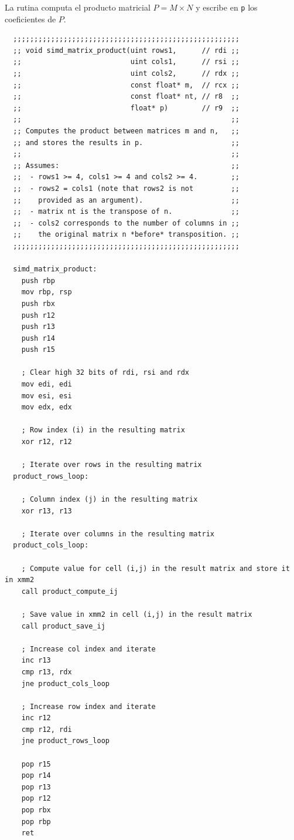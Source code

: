 \documentclass[a4paper, 10pt, twoside]{article}
\newcommand{\cc}[1]{\texttt{#1}}
\begin{document}
La rutina computa el producto matricial $P = M \times N$ y escribe en \cc{p}
los coeficientes de $P$.

\begin{verbatim}
  ;;;;;;;;;;;;;;;;;;;;;;;;;;;;;;;;;;;;;;;;;;;;;;;;;;;;;;
  ;; void simd_matrix_product(uint rows1,      // rdi ;;
  ;;                          uint cols1,      // rsi ;;
  ;;                          uint cols2,      // rdx ;;
  ;;                          const float* m,  // rcx ;;
  ;;                          const float* nt, // r8  ;;
  ;;                          float* p)        // r9  ;;
  ;;                                                  ;;
  ;; Computes the product between matrices m and n,   ;;
  ;; and stores the results in p.                     ;;
  ;;                                                  ;;
  ;; Assumes:                                         ;;
  ;;  - rows1 >= 4, cols1 >= 4 and cols2 >= 4.        ;;
  ;;  - rows2 = cols1 (note that rows2 is not         ;;
  ;;    provided as an argument).                     ;;
  ;;  - matrix nt is the transpose of n.              ;;
  ;;  - cols2 corresponds to the number of columns in ;;
  ;;    the original matrix n *before* transposition. ;;
  ;;;;;;;;;;;;;;;;;;;;;;;;;;;;;;;;;;;;;;;;;;;;;;;;;;;;;;

  simd_matrix_product:
    push rbp
    mov rbp, rsp
    push rbx
    push r12
    push r13
    push r14
    push r15

    ; Clear high 32 bits of rdi, rsi and rdx
    mov edi, edi
    mov esi, esi
    mov edx, edx

    ; Row index (i) in the resulting matrix
    xor r12, r12

    ; Iterate over rows in the resulting matrix
  product_rows_loop:

    ; Column index (j) in the resulting matrix
    xor r13, r13

    ; Iterate over columns in the resulting matrix
  product_cols_loop:

    ; Compute value for cell (i,j) in the result matrix and store it in xmm2
    call product_compute_ij

    ; Save value in xmm2 in cell (i,j) in the result matrix
    call product_save_ij

    ; Increase col index and iterate
    inc r13
    cmp r13, rdx
    jne product_cols_loop

    ; Increase row index and iterate
    inc r12
    cmp r12, rdi
    jne product_rows_loop

    pop r15
    pop r14
    pop r13
    pop r12
    pop rbx
    pop rbp
    ret
\end{verbatim}
\end{document}
